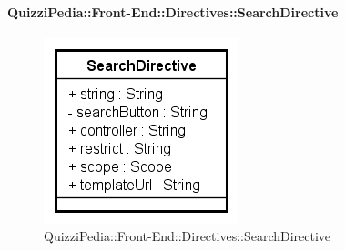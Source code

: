 \paragraph{QuizziPedia::Front-End::Directives::SearchDirective}

\label{QuizziPedia::Front-End::Directives::SearchDirective}

\begin{figure}[h]
	\centering
	\includegraphics[scale=0.80,keepaspectratio]{UML/Classi/Front-End/QuizziPedia_Front-end_Directives_SearchDirective.png}
	\caption{QuizziPedia::Front-End::Directives::SearchDirective}
\end{figure}

